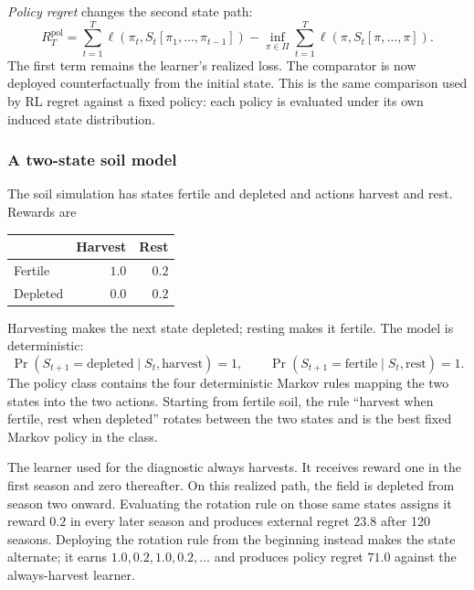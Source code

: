 \emph{Policy regret} changes the second state path:
\begin{equation}
R_T^{\mathrm{pol}}
=
\sum_{t=1}^T
\ell\!\left(\pi_t,S_t[\pi_1,\ldots,\pi_{t-1}]\right)
-
\inf_{\pi\in\Pi}
\sum_{t=1}^T
\ell\!\left(\pi,S_t[\pi,\ldots,\pi]\right).
\label{eq:online_policy_regret}
\end{equation}
The first term remains the learner's realized loss. The comparator is now deployed counterfactually from the initial state. This is the same comparison used by RL regret against a fixed policy: each policy is evaluated under its own induced state distribution.

\subsubsection{A two-state soil model}

The soil simulation has states fertile and depleted and actions harvest and rest. Rewards are
\begin{center}
\begin{tabular}{lrr}
\toprule
 & Harvest & Rest \\
\midrule
Fertile & $1.0$ & $0.2$ \\
Depleted & $0.0$ & $0.2$ \\
\bottomrule
\end{tabular}
\end{center}
Harvesting makes the next state depleted; resting makes it fertile. The model is deterministic:
\begin{equation}
\Pr(S_{t+1}=\text{depleted}\mid S_t,\text{harvest})=1,
\qquad
\Pr(S_{t+1}=\text{fertile}\mid S_t,\text{rest})=1.
\label{eq:soil_transitions}
\end{equation}
The policy class contains the four deterministic Markov rules mapping the two states into the two actions. Starting from fertile soil, the rule ``harvest when fertile, rest when depleted'' rotates between the two states and is the best fixed Markov policy in the class.

The learner used for the diagnostic always harvests. It receives reward one in the first season and zero thereafter. On this realized path, the field is depleted from season two onward. Evaluating the rotation rule on those same states assigns it reward $0.2$ in every later season and produces external regret $23.8$ after 120 seasons. Deploying the rotation rule from the beginning instead makes the state alternate; it earns $1.0,0.2,1.0,0.2,\ldots$ and produces policy regret $71.0$ against the always-harvest learner.

